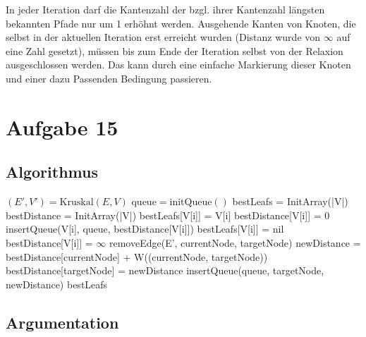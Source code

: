 \documentclass[parskip=half,a4paper]{scrartcl}
\begin{document}
In jeder Iteration darf die Kantenzahl der bzgl. ihrer Kantenzahl längsten bekannten Pfade nur um 1 erhöhnt werden. Ausgehende Kanten von Knoten, die selbst in der aktuellen Iteration erst erreicht wurden (Distanz wurde von $\infty$ auf eine Zahl gesetzt), müssen bis zum Ende der Iteration selbst von der Relaxion ausgeschlossen werden. Das kann durch eine einfache Markierung dieser Knoten und einer dazu Passenden Bedingung passieren.

\section*{Aufgabe 15}

\subsection*{Algorithmus}
\nolinenumbers
\begin{algorithmic}[1]
 
\State $(E',V') = \text{Kruskal}(E, V)$ 
\State $\text{queue} = \text{initQueue}()$
\State bestLeafs = InitArray(|V|)
\State bestDistance = InitArray(|V|)
 
 
\State bestLeafs[V[i]] = V[i]
\State bestDistance[V[i]] = 0
\State insertQueue(V[i], queue, bestDistance[V[i]]) 
\Else {}
\State bestLeafs[V[i]] = nil
\State bestDistance[V[i]] = $\infty$
\EndIf
\EndFor
{}\label{outer}
\label{inner}
\State removeEdge(E', currentNode, targetNode)
\State newDistance = bestDistance[currentNode] + W((currentNode, targetNode))
\State bestDistance[targetNode] = newDistance
\State insertQueue(queue, targetNode, newDistance) 
 
\EndIf
\EndWhile
\EndWhile
\State \Return bestLeafs
\EndProcedure
\end{algorithmic}
\linenumbers

\subsection*{Argumentation}
\end{document}
